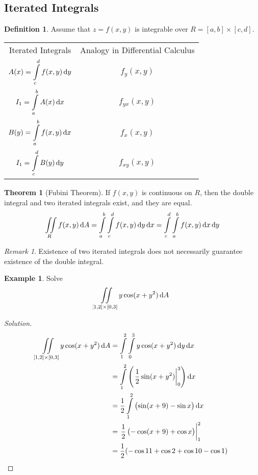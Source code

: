 \documentclass[fleqn, a4paper, 12pt]{article}
\theoremstyle{definition}
\newtheorem{example}{Example}
\newtheorem{definition}{Definition}
\theoremstyle{theorem}
\newtheorem{theorem}{Theorem}
\theoremstyle{remark}
\newtheorem{remark}{Remark}
\newenvironment{solution}
{\begin{proof}[Solution]\let\qed\relax}
	{\end{proof}}
\begin{document}
\subsection{Iterated Integrals}

\begin{definition}
	Assume that $z = f(x,y)$ is integrable over $R = [a,b] \times [c,d]$.
	\begin{tabular}{c c}
		Iterated Integrals & Analogy in Differential Calculus\\
		$\displaystyle A(x) = \int\limits_{c}^{d} f(x,y) \dif y$ & $f_y (x,y)$\\
		$\displaystyle I_1 = \int\limits_{a}^{b} A(x) \dif x$ & $f_{yx} (x,y)$\\
		$\displaystyle B(y) = \int\limits_{a}^{b} f(x,y) \dif x$ & $f_x (x,y)$\\
		$\displaystyle I_1 = \int\limits_{c}^{d} B(y) \dif y$ & $f_{xy} (x,y)$\\
	\end{tabular}
\end{definition}

\begin{theorem}[Fubini Theorem]
	If $f(x,y)$ is continuous on $R$, then the double integral and two iterated integrals exist, and they are equal.
	\begin{equation*}
		\iint\limits_{R} f(x,y) \dif A = \int\limits_{a}^{b} \int\limits_{c}^{d} f(x,y) \dif y \dif x = \int\limits_{c}^{d} \int\limits_{a}^{b} f(x,y) \dif x \dif y
	\end{equation*}
\end{theorem}

\begin{remark}
	Existence of two iterated integrals does not necessarily guarantee existence of the double integral.
\end{remark}

\begin{example}
	Solve 
	\[\iint\limits_{[1,2] \times [0,3]} y \cos (x + y^2) \dif A\]
\end{example}

\begin{solution}
	\begin{align*}
		\iint\limits_{[1,2] \times [0,3]} y \cos (x + y^2) \dif A &= \int\limits_{1}^{2} \int\limits_{0}^{3} y \cos (x + y^2) \dif y \dif x\\
		&= \int\limits_{1}^{2} \left( \left. \dfrac{1}{2} \sin (x + y^2) \right\rvert_{0}^{3} \right) \dif x\\
		&= \dfrac{1}{2} \int\limits_{1}^{2} \left( \sin(x + 9) - \sin x \right) \dif x\\
		&= \left. \dfrac{1}{2} \left( -\cos (x + 9) + \cos x \right) \right\rvert_{1}^{2}\\
		&= \dfrac{1}{2} (-\cos 11 + \cos 2 + \cos 10 - \cos 1)
	\end{align*}
\end{solution}
\end{document}
